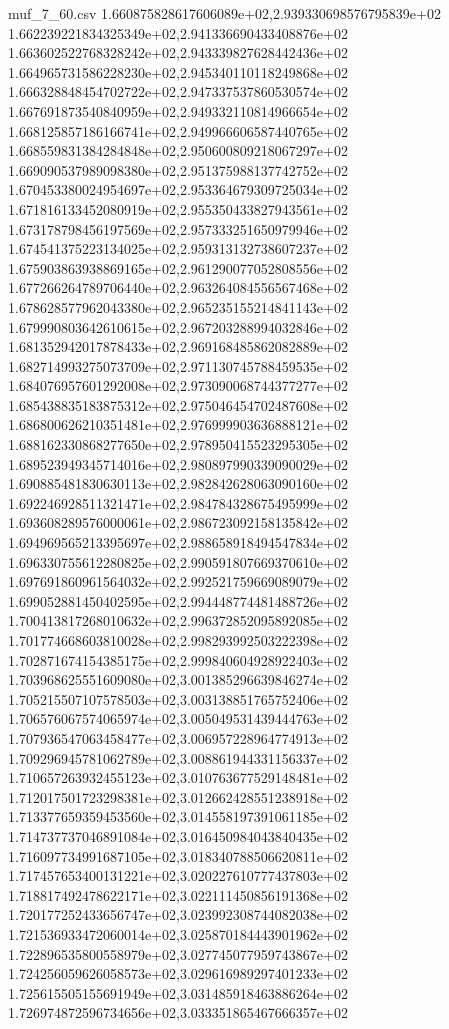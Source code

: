 \begin{filecontents*}{muf_7_60.csv}
1.660875828617606089e+02,2.939330698576795839e+02
1.662239221834325349e+02,2.941336690433408876e+02
1.663602522768328242e+02,2.943339827628442436e+02
1.664965731586228230e+02,2.945340110118249868e+02
1.666328848454702722e+02,2.947337537860530574e+02
1.667691873540840959e+02,2.949332110814966654e+02
1.668125857186166741e+02,2.949966606587440765e+02
1.668559831384284848e+02,2.950600809218067297e+02
1.669090537989098380e+02,2.951375988137742752e+02
1.670453380024954697e+02,2.953364679309725034e+02
1.671816133452080919e+02,2.955350433827943561e+02
1.673178798456197569e+02,2.957333251650979946e+02
1.674541375223134025e+02,2.959313132738607237e+02
1.675903863938869165e+02,2.961290077052808556e+02
1.677266264789706440e+02,2.963264084556567468e+02
1.678628577962043380e+02,2.965235155214841143e+02
1.679990803642610615e+02,2.967203288994032846e+02
1.681352942017878433e+02,2.969168485862082889e+02
1.682714993275073709e+02,2.971130745788459535e+02
1.684076957601292008e+02,2.973090068744377277e+02
1.685438835183875312e+02,2.975046454702487608e+02
1.686800626210351481e+02,2.976999903636888121e+02
1.688162330868277650e+02,2.978950415523295305e+02
1.689523949345714016e+02,2.980897990339090029e+02
1.690885481830630113e+02,2.982842628063090160e+02
1.692246928511321471e+02,2.984784328675495999e+02
1.693608289576000061e+02,2.986723092158135842e+02
1.694969565213395697e+02,2.988658918494547834e+02
1.696330755612280825e+02,2.990591807669370610e+02
1.697691860961564032e+02,2.992521759669089079e+02
1.699052881450402595e+02,2.994448774481488726e+02
1.700413817268010632e+02,2.996372852095892085e+02
1.701774668603810028e+02,2.998293992503222398e+02
1.702871674154385175e+02,2.999840604928922403e+02
1.703968625551609080e+02,3.001385296639846274e+02
1.705215507107578503e+02,3.003138851765752406e+02
1.706576067574065974e+02,3.005049531439444763e+02
1.707936547063458477e+02,3.006957228964774913e+02
1.709296945781062789e+02,3.008861944331156337e+02
1.710657263932455123e+02,3.010763677529148481e+02
1.712017501723298381e+02,3.012662428551238918e+02
1.713377659359453560e+02,3.014558197391061185e+02
1.714737737046891084e+02,3.016450984043840435e+02
1.716097734991687105e+02,3.018340788506620811e+02
1.717457653400131221e+02,3.020227610777437803e+02
1.718817492478622171e+02,3.022111450856191368e+02
1.720177252433656747e+02,3.023992308744082038e+02
1.721536933472060014e+02,3.025870184443901962e+02
1.722896535800558979e+02,3.027745077959743867e+02
1.724256059626058573e+02,3.029616989297401233e+02
1.725615505155691949e+02,3.031485918463886264e+02
1.726974872596734656e+02,3.033351865467666357e+02

\end{filecontents*}
